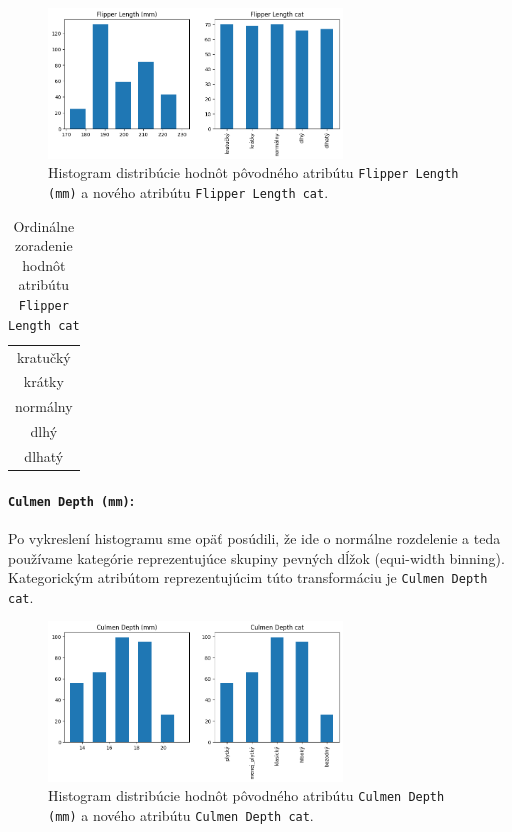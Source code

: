 \documentclass[10pt,xcolor=pdflatex,dvipsnames,table,oneside]{book}
\begin{document}
\begin{figure}[h]
  \centering
  \includegraphics[width=7.8cm]{img/flipper_length.png}
  \caption{Histogram distribúcie hodnôt pôvodného atribútu \texttt{Flipper Length (mm)} a nového atribútu \texttt{Flipper Length cat}.}
\end{figure}

\begin{table}[h]
\centering
\begin{tabular}{|c|}
\hline
kratučký                                 \\
krátky                                   \\
normálny                                 \\
dlhý                                     \\
dlhatý                                   \\ \hline
\end{tabular}
\caption{Ordinálne zoradenie hodnôt atribútu \texttt{Flipper Length cat}}
\end{table}

\paragraph{\texttt{Culmen Depth (mm)}:} Po vykreslení histogramu sme opäť posúdili, že ide o normálne rozdelenie a teda používame kategórie reprezentujúce skupiny pevných dĺžok (equi-width binning). Kategorickým atribútom reprezentujúcim túto transformáciu je \texttt{Culmen Depth cat}.

\begin{figure}[h]
  \centering
  \includegraphics[width=7.8cm]{img/culmen_depth.png}
  \caption{Histogram distribúcie hodnôt pôvodného atribútu \texttt{Culmen Depth (mm)} a nového atribútu \texttt{Culmen Depth cat}.}
\end{figure}
\end{document}
